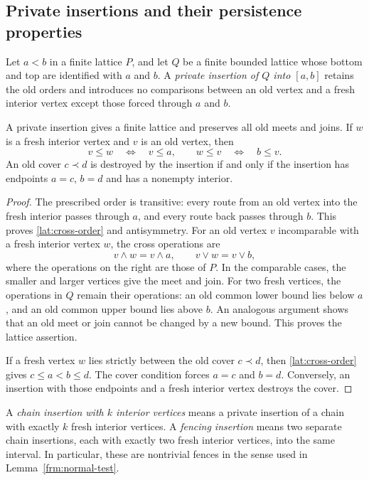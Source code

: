 \subsection{Private insertions and their persistence properties}

Let $a<b$ in a finite lattice $P$, and let $Q$ be a finite bounded
lattice whose bottom and top are identified with $a$ and $b$.
A \emph{private insertion of $Q$ into $[a,b]$} retains the old orders
and introduces no comparisons between an old vertex and a fresh
interior vertex except those forced through $a$ and $b$.

\begin{lemma}
\label{lat:insertion}
A private insertion gives a finite lattice and preserves all old meets
and joins.  If $w$ is a fresh interior vertex and $v$ is an old vertex,
then
\begin{equation}
\label{lat:cross-order}
 v\leq w\quad\Longleftrightarrow\quad v\leq a,
 \qquad
 w\leq v\quad\Longleftrightarrow\quad b\leq v.
\end{equation}
An old cover $c\prec d$ is destroyed by the insertion if and only if
the insertion has endpoints $a=c$, $b=d$ and has a nonempty interior.
\end{lemma}

\begin{proof}
The prescribed order is transitive: every route from an old vertex into
the fresh interior passes through $a$, and every route back passes
through $b$.  This proves \eqref{lat:cross-order} and antisymmetry.
For an old vertex $v$ incomparable with a fresh interior vertex $w$,
the cross operations are
\[
 v\wedge w=v\wedge a,
 \qquad v\vee w=v\vee b,
\]
where the operations on the right are those of $P$.  In the comparable
cases, the smaller and larger vertices give the meet and join.
For two fresh vertices, the operations in $Q$ remain their operations:
an old common lower bound lies below $a$, and an old common upper bound
lies above $b$.  An analogous argument shows that an old meet or join
cannot be changed by a new bound.  This proves the lattice assertion.

If a fresh vertex $w$ lies strictly between the old cover $c\prec d$,
then \eqref{lat:cross-order} gives $c\leq a<b\leq d$.
The cover condition forces $a=c$ and $b=d$.  Conversely, an insertion
with those endpoints and a fresh interior vertex destroys the cover.
\end{proof}

A \emph{chain insertion with $k$ interior vertices} means a private
insertion of a chain with exactly $k$ fresh interior vertices.  A
\emph{fencing insertion} means two separate chain insertions, each
with exactly two fresh interior vertices, into the same interval.
In particular, these are nontrivial fences in the sense used in
Lemma~\ref{frm:normal-test}.

